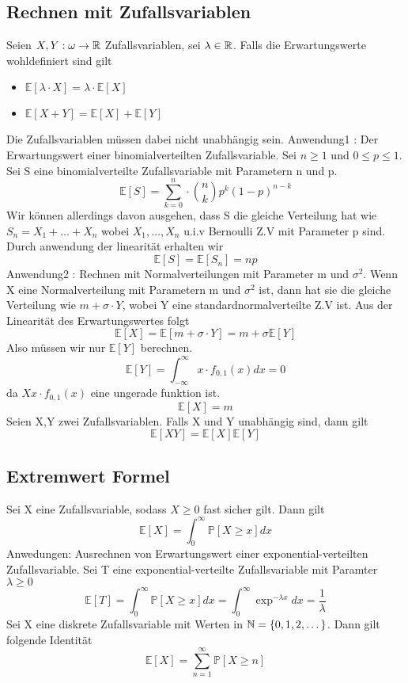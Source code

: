 \subsection{Rechnen mit Zufallsvariablen}
 \newline
Seien \(X, Y : \omega \rightarrow \mathbb{R} \) Zufallsvariablen, sei \(\lambda \in \mathbb{R}\). Falls die Erwartungswerte wohldefiniert sind gilt \begin{itemize}
    \item \(\mathbb{E}[ \lambda \cdot X ] = \lambda \cdot \mathbb{E}[X]\)
    \item \(\mathbb{E}[X + Y] = \mathbb{E}[X] + \mathbb{E}[Y]\)
\end{itemize}
\Bem[4.11] \newline 
Die Zufallsvariablen müssen dabei nicht unabhängig sein. \newline
\Bem[4.12] \newline
Anwendung1 : Der Erwartungswert einer binomialverteilten Zufallsvariable. Sei \( n \geq 1\) und \( 0 \leq p \leq 1 \). Sei S eine binomialverteilte Zufallsvariable mit Parametern n und p. \[\mathbb{E}[S] = \sum_{k=0}^{n} \cdot \binom{n}{k} p^k (1-p)^{n-k}\]
Wir können allerdings davon ausgehen, dass S die gleiche Verteilung hat wie \(S_n = X_1 + \dots + X_n\) wobei \(X_1 , \dots , X_n \) u.i.v Bernoulli Z.V mit Parameter p sind. Durch anwendung der linearität erhalten wir \[ \mathbb{E}[S] = \mathbb{E}[S_n] = np\]
Anwendung2 : Rechnen mit Normalverteilungen mit Parameter m und \( \sigma^2\). Wenn X eine Normalverteilung mit Parametern m und \( \sigma^2\) ist, dann hat sie die gleiche Verteilung wie \( m + \sigma \cdot Y\), wobei Y eine standardnormalverteilte Z.V ist. Aus der Linearität des Erwartungswertes folgt \[ \mathbb{E}[X] = \mathbb{E}[m + \sigma \cdot Y] = m + \sigma \mathbb{E}[Y]\] Also müssen wir nur \( \mathbb{E}[Y]\) berechnen. \[\mathbb{E}[Y] = \int_{-\infty}^{\infty} x \cdot f_{0,1}(x) dx = 0\] da \(X x \cdot f_{0,1}(x)\) eine ungerade funktion ist. \[\mathbb{E}[X] = m\]
\Theo[4.13] Seien X,Y zwei Zufallsvariablen. Falls X und Y unabhängig sind, dann gilt \[ \mathbb{E}[XY] = \mathbb{E}[X]\mathbb{E}[Y]\]
\subsection{Extremwert Formel}
 \newline
Sei X eine Zufallsvariable, sodass \( X \geq 0 \) fast sicher gilt. Dann gilt \[ \mathbb{E}[X] = \int_0^{\infty} \mathbb{P}[X \geq x]dx\]
\Bem[4.14A]
Anwedungen: Ausrechnen von Erwartungswert einer exponential-verteilten Zufallsvariable. Sei T eine exponential-verteilte Zufallsvariable mit Paramter \(\lambda \geq 0\) \[ \mathbb{E}[T] = \int_0^\infty \mathbb{P}[X \geq x]dx = \int_0^\infty \exp^{-\lambda x }dx = \frac{1}{\lambda}\]
 \newline
Sei X eine diskrete Zufallsvariable mit Werten in \( \mathbb{N} = \{0, 1, 2, \dots \}\). Dann gilt folgende Identität \[ \mathbb{E}[X] = \sum_{n=1}^{\infty} \mathbb{P}[X \geq n]\]
